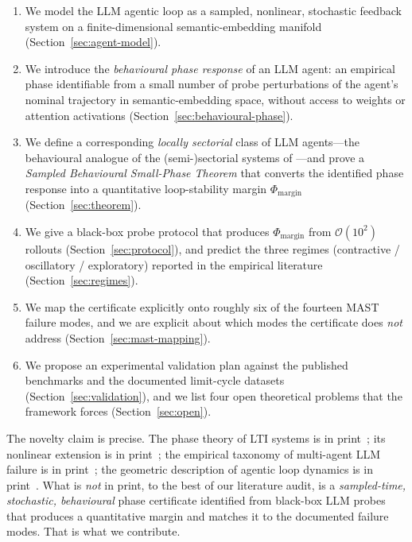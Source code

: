 \documentclass[11pt,a4paper]{article}
\theoremstyle{definition}
\theoremstyle{remark}
\newcommand{\PhaseMargin}{\Phi_{\mathrm{margin}}}
\begin{document}
\begin{enumerate}[leftmargin=*]
\item We model the LLM agentic loop as a sampled, nonlinear, stochastic
feedback system on a finite-dimensional semantic-embedding manifold
(Section~\ref{sec:agent-model}).
\item We introduce the \emph{behavioural phase response} of an LLM agent:
an empirical phase identifiable from a small number of probe perturbations
of the agent's nominal trajectory in semantic-embedding space, without
access to weights or attention activations
(Section~\ref{sec:behavioural-phase}).
\item We define a corresponding \emph{locally sectorial} class of LLM
agents---the behavioural analogue of the (semi-)sectorial systems of
\citet{Chen2023PhaseTheory}---and prove a \emph{Sampled Behavioural
Small-Phase Theorem} that converts the identified phase response into a
quantitative loop-stability margin
$\PhaseMargin$ (Section~\ref{sec:theorem}).
\item We give a black-box probe protocol that produces $\PhaseMargin$ from
$\mathcal{O}(10^{2})$ rollouts (Section~\ref{sec:protocol}), and predict
the three regimes (contractive / oscillatory / exploratory) reported in
the empirical literature (Section~\ref{sec:regimes}).
\item We map the certificate explicitly onto roughly six of the fourteen
MAST failure modes, and we are explicit about which modes the certificate
does \emph{not} address (Section~\ref{sec:mast-mapping}).
\item We propose an experimental validation plan against the published
benchmarks and the documented limit-cycle datasets
(Section~\ref{sec:validation}), and we list four open theoretical problems
that the framework forces (Section~\ref{sec:open}).
\end{enumerate}

The novelty claim is precise.  The phase theory of LTI systems is in
print~\citep{Chen2023PhaseTheory}; its nonlinear extension is in
print~\citep{Chen2021PhaseNonlinear}; the empirical taxonomy of multi-agent
LLM failure is in print~\citep{Cemri2025MAST}; the geometric description
of agentic loop dynamics is in print~\citep{Tacheny2025AgenticLoops}.  What is
\emph{not} in print, to the best of our literature audit, is a
\emph{sampled-time, stochastic, behavioural} phase certificate identified
from black-box LLM probes that produces a quantitative margin and
matches it to the documented failure modes.  That is what we contribute.
\end{document}
